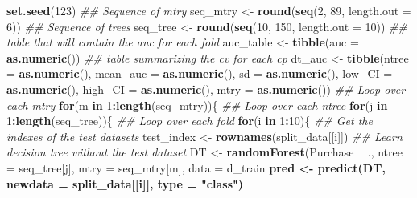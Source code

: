 \documentclass[
  12pt,
  oneside]{report}
\newenvironment{Shaded}{\begin{snugshade}}{\end{snugshade}}
\newcommand{\CommentTok}[1]{\textcolor[rgb]{0.56,0.35,0.01}{\textit{#1}}}
\newcommand{\ControlFlowTok}[1]{\textcolor[rgb]{0.13,0.29,0.53}{\textbf{#1}}}
\newcommand{\DataTypeTok}[1]{\textcolor[rgb]{0.13,0.29,0.53}{#1}}
\newcommand{\DecValTok}[1]{\textcolor[rgb]{0.00,0.00,0.81}{#1}}
\newcommand{\KeywordTok}[1]{\textcolor[rgb]{0.13,0.29,0.53}{\textbf{#1}}}
\newcommand{\NormalTok}[1]{#1}
\newcommand{\OperatorTok}[1]{\textcolor[rgb]{0.81,0.36,0.00}{\textbf{#1}}}
\newcommand{\StringTok}[1]{\textcolor[rgb]{0.31,0.60,0.02}{#1}}
\begin{document}
\begin{Shaded}
\begin{Highlighting}[]
\KeywordTok{set.seed}\NormalTok{(}\DecValTok{123}\NormalTok{)}
\CommentTok{## Sequence of mtry}
\NormalTok{seq_mtry <-}\StringTok{ }\KeywordTok{round}\NormalTok{(}\KeywordTok{seq}\NormalTok{(}\DecValTok{2}\NormalTok{, }\DecValTok{89}\NormalTok{, }\DataTypeTok{length.out =} \DecValTok{6}\NormalTok{))}
\CommentTok{## Sequence of trees}
\NormalTok{seq_tree <-}\StringTok{ }\KeywordTok{round}\NormalTok{(}\KeywordTok{seq}\NormalTok{(}\DecValTok{10}\NormalTok{, }\DecValTok{150}\NormalTok{, }\DataTypeTok{length.out =} \DecValTok{10}\NormalTok{))}
\CommentTok{## table that will contain the auc for each fold}
\NormalTok{auc_table <-}\StringTok{ }\KeywordTok{tibble}\NormalTok{(}\DataTypeTok{auc =} \KeywordTok{as.numeric}\NormalTok{())}
\CommentTok{## table summarizing the cv for each cp}
\NormalTok{dt_auc <-}\StringTok{ }\KeywordTok{tibble}\NormalTok{(}\DataTypeTok{ntree =} \KeywordTok{as.numeric}\NormalTok{(),}
                 \DataTypeTok{mean_auc =} \KeywordTok{as.numeric}\NormalTok{(),}
                 \DataTypeTok{sd =} \KeywordTok{as.numeric}\NormalTok{(),}
                 \DataTypeTok{low_CI =} \KeywordTok{as.numeric}\NormalTok{(),}
                 \DataTypeTok{high_CI  =} \KeywordTok{as.numeric}\NormalTok{(),}
                 \DataTypeTok{mtry =} \KeywordTok{as.numeric}\NormalTok{())}
\CommentTok{## Loop over each mtry}
\ControlFlowTok{for}\NormalTok{(m }\ControlFlowTok{in} \DecValTok{1}\OperatorTok{:}\KeywordTok{length}\NormalTok{(seq_mtry))\{}
  \CommentTok{## Loop over each ntree}
  \ControlFlowTok{for}\NormalTok{(j }\ControlFlowTok{in} \DecValTok{1}\OperatorTok{:}\KeywordTok{length}\NormalTok{(seq_tree))\{}
    \CommentTok{## Loop over each fold}
    \ControlFlowTok{for}\NormalTok{(i }\ControlFlowTok{in} \DecValTok{1}\OperatorTok{:}\DecValTok{10}\NormalTok{)\{}
      \CommentTok{## Get the indexes of the test datasets}
\NormalTok{      test_index <-}\StringTok{ }\KeywordTok{rownames}\NormalTok{(split_data[[i]])}
      \CommentTok{## Learn decision tree without the test dataset }
\NormalTok{      DT <-}\StringTok{ }\KeywordTok{randomForest}\NormalTok{(Purchase }\OperatorTok{~}\StringTok{ }\NormalTok{., }\DataTypeTok{ntree =}\NormalTok{ seq_tree[j], }\DataTypeTok{mtry =}\NormalTok{ seq_mtry[m],}
                  \DataTypeTok{data =}\NormalTok{ d_train }\OperatorTok{%
\NormalTok{      pred <-}\StringTok{ }\KeywordTok{predict}\NormalTok{(DT, }\DataTypeTok{newdata =}\NormalTok{ split_data[[i]], }\DataTypeTok{type =} \StringTok{"class"}\NormalTok{)}
}
\end{Highlighting}
\end{Shaded}
\end{document}
